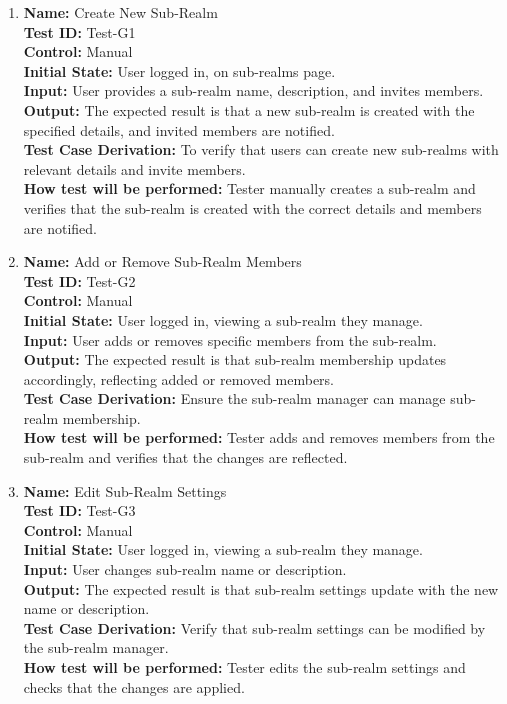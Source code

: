 \documentclass[12pt, titlepage]{article}
\begin{document}
\begin{enumerate}

  \item \textbf{Name:} {Create New Sub-Realm} \label{itm:Test-G1}\\
        \textbf{Test ID:} Test-G1\\
        \textbf{Control:} Manual \\
        \textbf{Initial State:} User logged in, on sub-realms page. \\
        \textbf{Input:} User provides a sub-realm name, description, and invites members. \\
        \textbf{Output:} The expected result is that a new sub-realm is created with the specified details, and invited members are notified. \\
        \textbf{Test Case Derivation:} To verify that users can create new sub-realms with relevant details and invite members. \\
        \textbf{How test will be performed:} Tester manually creates a sub-realm and verifies that the sub-realm is created with the correct details and members are notified.

  \item \textbf{Name:} {Add or Remove Sub-Realm Members} \label{itm:Test-G2}\\
        \textbf{Test ID:} Test-G2\\
        \textbf{Control:} Manual \\
        \textbf{Initial State:} User logged in, viewing a sub-realm they manage. \\
        \textbf{Input:} User adds or removes specific members from the sub-realm. \\
        \textbf{Output:} The expected result is that sub-realm membership updates accordingly, reflecting added or removed members. \\
        \textbf{Test Case Derivation:} Ensure the sub-realm manager can manage sub-realm membership. \\
        \textbf{How test will be performed:} Tester adds and removes members from the sub-realm and verifies that the changes are reflected.

  \item \textbf{Name:} {Edit Sub-Realm Settings} \label{itm:Test-G3}\\
        \textbf{Test ID:} Test-G3\\
        \textbf{Control:} Manual \\
        \textbf{Initial State:} User logged in, viewing a sub-realm they manage. \\
        \textbf{Input:} User changes sub-realm name or description. \\
        \textbf{Output:} The expected result is that sub-realm settings update with the new name or description. \\
        \textbf{Test Case Derivation:} Verify that sub-realm settings can be modified by the sub-realm manager. \\
        \textbf{How test will be performed:} Tester edits the sub-realm settings and checks that the changes are applied.


\end{enumerate}
\end{document}
